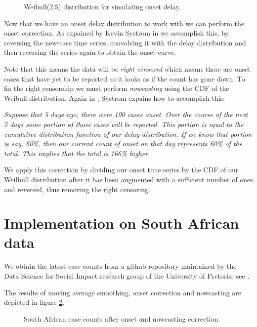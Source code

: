 \documentclass[11pt]{article}
\begin{document}
\begin{figure}[H]
\begin{center}
\end{center}
\caption{Weibull(2,5) distribution for simulating onset delay.}  
\label{fig_weibull}
\end{figure}

Now that we have an onset delay distribution to work with we can perform the onset correction.
As expained by Kevin Systrom in \cite{systrom} we accomplish this, by reversing the new-case time series, 
convolving it with the delay distribution and then reversing the series again to obtain the onset curve. 

Note that this means the data will be {\it right censored} which means there are onset cases
that have yet to be reported so it looks as if the count has gone down.
To fix the right censorship we must perform {\it nowcasting} using the CDF
of the Weibull distribution. Again in \cite{systrom}, Systrom expains how to
accomplish this:

{\it Suppose that 5 days ago, there were 100 cases onset. Over the course of the next 5 days some portion of those cases will be reported. This portion is equal to the cumulative distribution function of our delay distribution. If we know that portion is say, 60\%, then our current count of onset on that day represents 60\% of the total. This implies that the total is 166\% higher. }

We apply this correction by dividing our onset time series by the CDF of our Weilbull distribution after it has been 
augmented with a sufficient number of ones and reversed, thus removing the right censoring.
 
\section{Implementation on South African data}

We obtain the latest case counts from a github repository maintained by the Data Science for Social Impact research group
of the University of Pretoria, see \cite{dsfsi}.

The results of moving average smoothing, onset correction and nowcasting 
are depicted in figure \ref{fig_onset_now_za}.

\begin{figure}[H]
\begin{center}
\end{center}
\caption{South African case counts after onset and nowcasting correction.}  
\label{fig_onset_now_za}
\end{figure}
\end{document}
